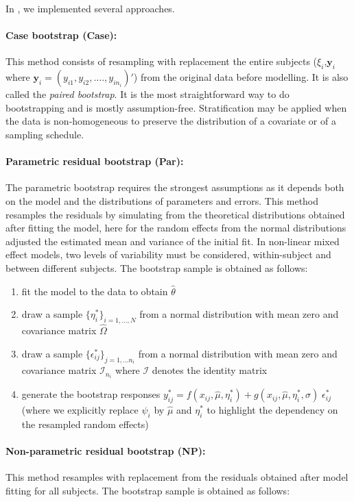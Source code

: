 In \monolix, we implemented several approaches.

\paragraph{Case bootstrap (Case):} This method consists of resampling with replacement the entire subjects ($\xi_i$,$\textbf{y}_i$ where $\textbf{y}_i= (y_{i1},y_{i2},....,y_{in_i})'$) from the original data before modelling. It is also called the \emph{paired bootstrap}. It is the most straightforward way to do bootstrapping and is mostly assumption-free. Stratification may be applied when the data is non-homogeneous to preserve the distribution of a covariate or of a sampling schedule.

\paragraph{Parametric residual bootstrap (Par):} The parametric bootstrap requires the strongest assumptions as it depends both on the model and the distributions of parameters and errors. This method resamples the residuals by simulating from the theoretical distributions obtained after fitting the model, here for the random effects from the normal distributions adjusted the estimated mean and variance of the initial fit. In non-linear mixed effect models, two levels of variability must be considered, within-subject and between different subjects. The bootstrap sample is obtained as follows:

\begin{enumerate} 
  \item fit the model to the data to obtain $\hat{\theta}$
  \item draw a sample $\{\eta^{*}_i\}_{i=1, \dots, N}$ from a normal distribution with mean zero and covariance matrix $\hat{\Omega}$
  \item draw a sample $\{\epsilon^{*}_{ij}\}_{j=1, \dots n_i}$ from a normal distribution with mean zero and covariance matrix $\mathcal{I}_{n_i}$ where $\mathcal{I}$ denotes the identity matrix
  \item generate the bootstrap responses $y^{*}_{ij}=  f(x_{ij}, \hat{\mu}, \eta^*_i) + g(x_{ij}, \hat{\mu}, \eta^*_i, \sigma) \; \epsilon^*_{ij}$ (where we explicitly replace $\psi_i$ by $\hat{\mu}$ and $\eta^*_i$ to highlight the dependency on the resampled random effects)
\end{enumerate}


\paragraph{Non-parametric residual bootstrap (NP):} This method resamples with replacement from the residuals obtained after model fitting for all subjects. The bootstrap sample is obtained as follows:

